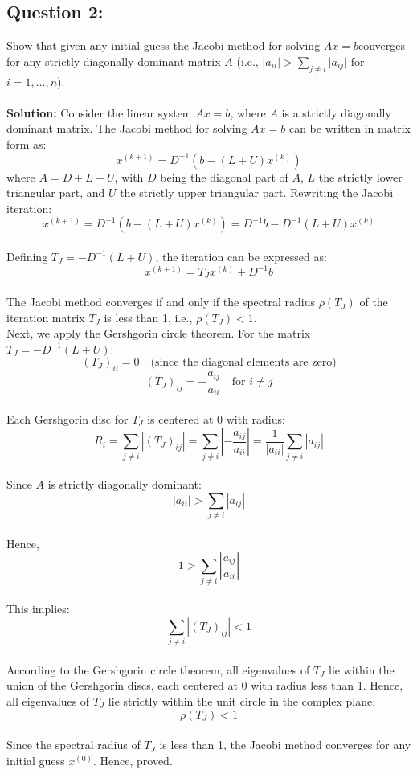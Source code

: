 \documentclass[11pt,onecolumn]{article}
\begin{document}
\subsection*{Question 2:}
Show that given any initial guess the Jacobi method for solving $Ax=b $converges for any strictly diagonally dominant matrix $A$ (i.e., $\lvert a_{ii} \rvert > \sum_{j\neq i} \lvert a_{ij} \rvert$ for $i=1,\ldots,n$).
\\
\vspace{0pt}
\\
\textbf{Solution:}
Consider the linear system \(Ax = b\), where \(A\) is a strictly diagonally dominant matrix.
The Jacobi method for solving \(Ax = b\) can be written in matrix form as:
\[
x^{(k+1)} = D^{-1}(b - (L + U)x^{(k)})
\]
where \(A = D + L + U\), with \(D\) being the diagonal part of \(A\), \(L\) the strictly lower triangular part, and \(U\) the strictly upper triangular part.
Rewriting the Jacobi iteration:
\[
x^{(k+1)} = D^{-1}(b - (L + U)x^{(k)}) = D^{-1}b - D^{-1}(L + U)x^{(k)}
\]
\\
Defining \(T_J = -D^{-1}(L + U)\), the iteration can be expressed as:
\[
x^{(k+1)} = T_J x^{(k)} + D^{-1}b
\]
\\
The Jacobi method converges if and only if the spectral radius \(\rho(T_J)\) of the iteration matrix \(T_J\) is less than 1, i.e., \(\rho(T_J) < 1\).
\\
Next, we apply the Gershgorin circle theorem. For the matrix \(T_J = -D^{-1}(L + U)\):
\[
(T_J)_{ii} = 0 \quad \text{(since the diagonal elements are zero)}
\]
\[
(T_J)_{ij} = -\frac{a_{ij}}{a_{ii}} \quad \text{for } i \neq j
\]
\\
Each Gershgorin disc for \(T_J\) is centered at 0 with radius:
\[
R_i = \sum_{j \neq i} \left| (T_J)_{ij} \right| = \sum_{j \neq i} \left| -\frac{a_{ij}}{a_{ii}} \right| = \frac{1}{|a_{ii}|} \sum_{j \neq i} |a_{ij}|
\]
\\
Since \(A\) is strictly diagonally dominant:
\[
|a_{ii}| > \sum_{j \neq i} |a_{ij}|
\]
\\
Hence,
\[
1 > \sum_{j \neq i} \left| \frac{a_{ij}}{a_{ii}} \right|
\]
\\
This implies:
\[
\sum_{j \neq i} \left| (T_J)_{ij} \right| < 1
\]
\\
According to the Gershgorin circle theorem, all eigenvalues of \(T_J\) lie within the union of the Gershgorin discs, each centered at 0 with radius less than 1. Hence, all eigenvalues of \(T_J\) lie strictly within the unit circle in the complex plane:
\[
\rho(T_J) < 1
\]
\\
Since the spectral radius of \(T_J\) is less than 1, the Jacobi method converges for any initial guess \(x^{(0)}\).
Hence, proved.
\end{document}
